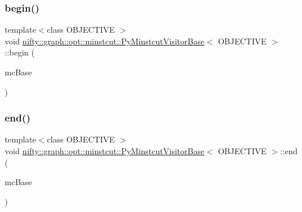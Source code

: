 \subsubsection{\texorpdfstring{begin()}{begin()}}
{\footnotesize\ttfamily template$<$class O\+B\+J\+E\+C\+T\+I\+VE $>$ \\
void \hyperlink{classnifty_1_1graph_1_1opt_1_1minstcut_1_1PyMinstcutVisitorBase}{nifty\+::graph\+::opt\+::minstcut\+::\+Py\+Minstcut\+Visitor\+Base}$<$ O\+B\+J\+E\+C\+T\+I\+VE $>$\+::begin (\begin{DoxyParamCaption}\item[{\hyperlink{classnifty_1_1graph_1_1opt_1_1minstcut_1_1PyMinstcutVisitorBase_a77d46bc1780dd5d3aafdb832f529859b}{Mc\+Base} $\ast$}]{mc\+Base }\end{DoxyParamCaption})\hspace{0.3cm}{\ttfamily [inline]}}

\mbox{\label{classnifty_1_1graph_1_1opt_1_1minstcut_1_1PyMinstcutVisitorBase_a9f2e4132c451512727e621287cacc760}} 
\subsubsection{\texorpdfstring{end()}{end()}}
{\footnotesize\ttfamily template$<$class O\+B\+J\+E\+C\+T\+I\+VE $>$ \\
void \hyperlink{classnifty_1_1graph_1_1opt_1_1minstcut_1_1PyMinstcutVisitorBase}{nifty\+::graph\+::opt\+::minstcut\+::\+Py\+Minstcut\+Visitor\+Base}$<$ O\+B\+J\+E\+C\+T\+I\+VE $>$\+::end (\begin{DoxyParamCaption}\item[{\hyperlink{classnifty_1_1graph_1_1opt_1_1minstcut_1_1PyMinstcutVisitorBase_a77d46bc1780dd5d3aafdb832f529859b}{Mc\+Base} $\ast$}]{mc\+Base }\end{DoxyParamCaption})\hspace{0.3cm}{\ttfamily [inline]}}

\mbox{\label{classnifty_1_1graph_1_1opt_1_1minstcut_1_1PyMinstcutVisitorBase_a32ac765a4f9124c178450d5d5c865b49}} 
